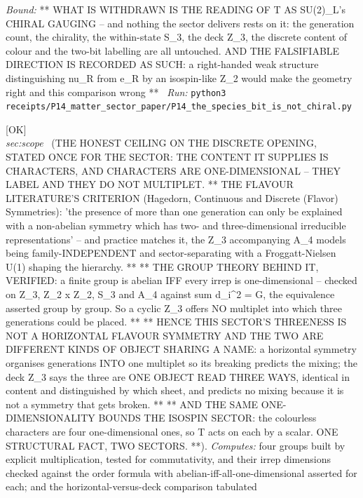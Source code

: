 \begin{description}
 \emph{Bound:} ** WHAT IS WITHDRAWN IS THE READING OF T AS SU(2)\_L's CHIRAL GAUGING -- and nothing the sector delivers rests on it: the generation count, the chirality, the within-state S\_3, the deck Z\_3, the discrete content of colour and the two-bit labelling are all untouched. AND THE FALSIFIABLE DIRECTION IS RECORDED AS SUCH: a right-handed weak structure distinguishing nu\_R from e\_R by an isospin-like Z\_2 would make the geometry right and this comparison wrong **
\ \emph{Run:} \texttt{python3 receipts/P14\_matter\_sector\_paper/P14\_the\_species\_bit\_is\_not\_chiral.py}
\item[\rcptlabel{P14_characters_label_they_do_not_multiplet}{P14R41}\textbf{P14R41}\quad\texttt{P14\_characters\_label\_they\_do\_not\_multiplet}]\hfill\textsf{[OK]}\\
\textit{sec:scope} \ (THE HONEST CEILING ON THE DISCRETE OPENING, STATED ONCE FOR THE SECTOR: THE CONTENT IT SUPPLIES IS CHARACTERS, AND CHARACTERS ARE ONE-DIMENSIONAL -- THEY LABEL AND THEY DO NOT MULTIPLET. ** THE FLAVOUR LITERATURE'S CRITERION (Hagedorn, Continuous and Discrete (Flavor) Symmetries): 'the presence of more than one generation can only be explained with a non-abelian symmetry which has two- and three-dimensional irreducible representations' -- and practice matches it, the Z\_3 accompanying A\_4 models being family-INDEPENDENT and sector-separating with a Froggatt-Nielsen U(1) shaping the hierarchy. ** ** THE GROUP THEORY BEHIND IT, VERIFIED: a finite group is abelian IFF every irrep is one-dimensional -- checked on Z\_3, Z\_2 x Z\_2, S\_3 and A\_4 against sum d\_i\textasciicircum{}2 = \textbar{}G\textbar{}, the equivalence asserted group by group. So a cyclic Z\_3 offers NO multiplet into which three generations could be placed. ** ** HENCE THIS SECTOR'S THREENESS IS NOT A HORIZONTAL FLAVOUR SYMMETRY AND THE TWO ARE DIFFERENT KINDS OF OBJECT SHARING A NAME: a horizontal symmetry organises generations INTO one multiplet so its breaking predicts the mixing; the deck Z\_3 says the three are ONE OBJECT READ THREE WAYS, identical in content and distinguished by which sheet, and predicts no mixing because it is not a symmetry that gets broken. ** ** AND THE SAME ONE-DIMENSIONALITY BOUNDS THE ISOSPIN SECTOR: the colourless characters are four one-dimensional ones, so T acts on each by a scalar. ONE STRUCTURAL FACT, TWO SECTORS. **). 
\emph{Computes:} four groups built by explicit multiplication, tested for commutativity, and their irrep dimensions checked against the order formula with abelian-iff-all-one-dimensional asserted for each; and the horizontal-versus-deck comparison tabulated

\end{description}
